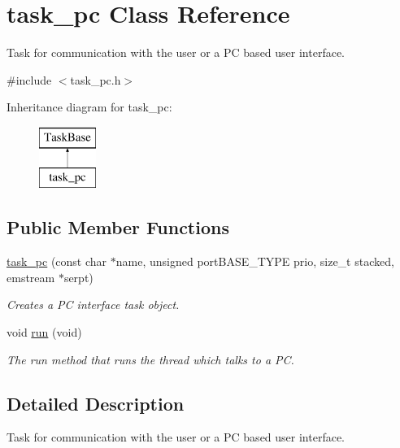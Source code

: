 \hypertarget{classtask__pc}{\section{task\-\_\-pc Class Reference}
\label{classtask__pc}
}


Task for communication with the user or a P\-C based user interface.  




{\ttfamily \#include $<$task\-\_\-pc.\-h$>$}

Inheritance diagram for task\-\_\-pc\-:\begin{figure}[H]
\begin{center}
\leavevmode
\includegraphics[height=2.000000cm]{classtask__pc}
\end{center}
\end{figure}
\subsection*{Public Member Functions}
\begin{DoxyCompactItemize}
\item 
\hyperlink{classtask__pc_af4f825f6eea2b0cb64fd5ea5944aae21}{task\-\_\-pc} (const char $\ast$name, unsigned port\-B\-A\-S\-E\-\_\-\-T\-Y\-P\-E prio, size\-\_\-t stacked, emstream $\ast$serpt)
\begin{DoxyCompactList}\small\item\em Creates a P\-C interface task object. \end{DoxyCompactList}\item 
void \hyperlink{classtask__pc_a13b52c6ffaf6fd24de7d0d003556d9c1}{run} (void)
\begin{DoxyCompactList}\small\item\em The run method that runs the thread which talks to a P\-C. \end{DoxyCompactList}\end{DoxyCompactItemize}


\subsection{Detailed Description}
Task for communication with the user or a P\-C based user interface. 


